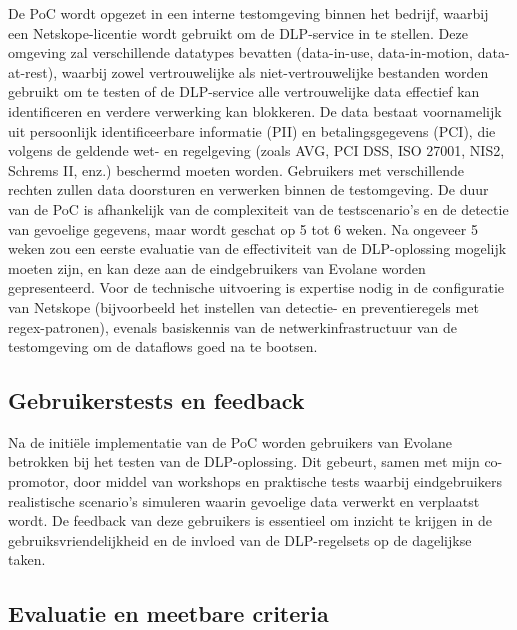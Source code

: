 De PoC wordt opgezet in een interne testomgeving binnen het bedrijf, waarbij een Netskope-licentie wordt gebruikt om de DLP-service in te stellen. 
Deze omgeving zal verschillende datatypes bevatten (data-in-use, data-in-motion, data-at-rest), 
waarbij zowel vertrouwelijke als niet\--vertr\-ouwelijke bestanden worden gebruikt om te testen of de DLP-service alle vertrouwelijke data effectief kan identificeren en verdere verwerking kan blokkeren. 
De data bestaat voornamelijk uit persoonlijk identificeerbare informatie (PII) en betalingsgegevens (PCI), die volgens de geldende wet- en regelgeving (zoals AVG, PCI DSS, ISO 27001, NIS2, Schrems II, enz.) beschermd moeten worden. 
Gebruikers met verschillende rechten zullen data doorsturen en verwerken binnen de testomgeving. 
De duur van de PoC is afhankelijk van de complexiteit van de testscenario's en de detectie van gevoelige gegevens, 
maar wordt geschat op 5 tot 6 weken. 
Na ongeveer 5 weken zou een eerste evaluatie van de effectiviteit van de DLP-oplossing mogelijk moeten zijn, 
en kan deze aan de eindgebruikers van Evolane worden gepresenteerd. 
Voor de technische uitvoering is expertise nodig in de configuratie van Netskope (bijvoorbeeld het instellen van detectie- en preventieregels met regex-patronen), 
evenals basiskennis van de netwerkinfrastructuur van de testomgeving om de dataflows goed na te bootsen.

\subsection{Gebruikerstests en feedback}%

Na de initiële implementatie van de PoC worden gebruikers van Evolane betrokken bij het testen van de DLP-oplossing. 
Dit gebeurt, samen met mijn co-promotor, door middel van workshops en praktische tests waarbij eindgebruikers realistische scenario's simuleren waarin gevoelige data verwerkt en verplaatst wordt. 
De feedback van deze gebruikers is essentieel om inzicht te krijgen in de gebruiksvriendelijkheid en de invloed van de DLP-regelsets op de dagelijkse taken. 

\subsection{Evaluatie en meetbare criteria}%

